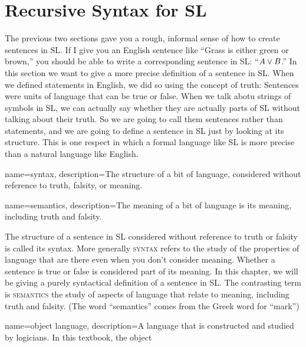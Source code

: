 \label{recursive_syntax_for_SL}

\section{Recursive Syntax for SL} %

The previous two sections gave you a rough, informal sense of how to create sentences in SL. If I give you an English sentence like ``Grass is either green or brown,'' you should be able to write a corresponding sentence in SL: ``$A \vee B$.'' In this section we want to give a more precise definition of a sentence in SL.  When we defined statements in English, we did so using the concept of truth: Sentences were units of language that can be true or false. When we talk abotu strings of symbols in SL, we can actually say whether they are actually parts of SL without talking about their truth. So we are going to call them sentences rather than statements, and we are going to define a sentence in SL just by looking at its structure. This is one respect in which a formal language like SL is more precise than a natural language like English.

{
name=syntax,
description={The structure of a bit of language, considered without reference to truth, falsity, or meaning.}
}

{
name=semantics,
description={The meaning of a bit of language is its meaning, including truth and falsity.}
}

The structure of a sentence in SL considered without reference to truth or falsity is called its syntax. More generally \textsc{\gls{syntax}} \label{def:syntax} refers to the study of the properties of language that are there even when you don't consider meaning. Whether a sentence is true or false is considered part of its meaning. In this chapter, we will be giving a purely syntactical definition of a sentence in SL.  The contrasting term is \textsc{\gls{semantics}} \label{def:semantics} the study of aspects of language that relate to meaning, including truth and falsity. (The word ``semantics'' comes from the Greek word for ``mark'')

{
name=object language,
description={A language that is constructed and studied by logicians. In this textbook, the object }
}



